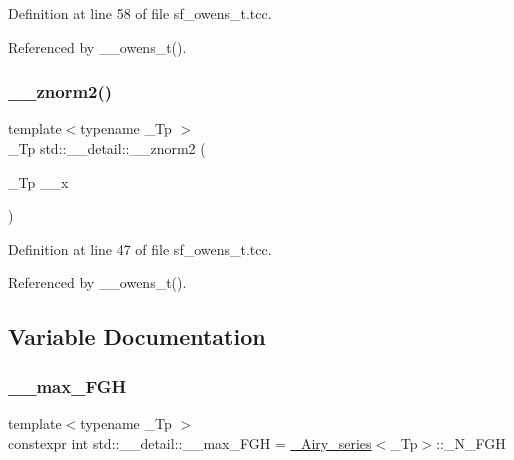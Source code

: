Definition at line 58 of file sf\+\_\+owens\+\_\+t.\+tcc.



Referenced by \+\_\+\+\_\+owens\+\_\+t().

\mbox{\label{namespacestd_1_1____detail_adf930b70ca943c6810ac7d2ea78d2cc3}} 
\subsubsection{\texorpdfstring{\+\_\+\+\_\+znorm2()}{\_\_znorm2()}}
{\footnotesize\ttfamily template$<$typename \+\_\+\+Tp $>$ \\
\+\_\+\+Tp std\+::\+\_\+\+\_\+detail\+::\+\_\+\+\_\+znorm2 (\begin{DoxyParamCaption}\item[{\+\_\+\+Tp}]{\+\_\+\+\_\+x }\end{DoxyParamCaption})}



Definition at line 47 of file sf\+\_\+owens\+\_\+t.\+tcc.



Referenced by \+\_\+\+\_\+owens\+\_\+t().



\subsection{Variable Documentation}
\mbox{\label{namespacestd_1_1____detail_ae3ef7007b55cd83fa162820c809a2995}} 
\subsubsection{\texorpdfstring{\+\_\+\+\_\+max\+\_\+\+F\+GH}{\_\_max\_FGH}}
{\footnotesize\ttfamily template$<$typename \+\_\+\+Tp $>$ \\
constexpr int std\+::\+\_\+\+\_\+detail\+::\+\_\+\+\_\+max\+\_\+\+F\+GH = \hyperlink{classstd_1_1____detail_1_1__Airy__series}{\+\_\+\+Airy\+\_\+series}$<$\+\_\+\+Tp$>$\+::\+\_\+\+N\+\_\+\+F\+GH}



